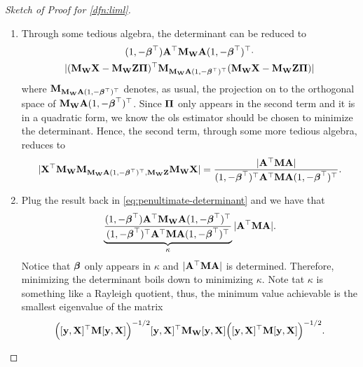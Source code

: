 \documentclass[a4paper]{article}
\begin{document}
\begin{proof}[Sketch of Proof for \autoref{dfn:liml}]
\begin{enumerate}
			Hence, to minimize the determinant, we should simply use the \gls*{ols} estimators for that column.
			We can simply consider the model with those variables partialled out:
			\begin{align*}
				|(\AA\GAMMA-\BB\XI)\T\MM_{\WW}(\AA\GAMMA-\BB\XI)|
			\end{align*}
			Another way of understanding this is to invoke the Frisch-Waugh-Lovell theorem before writing the likelihood function.
		\item
			Through some tedious algebra,
			the determinant can be reduced to
			\begin{align}\label{eq:penultimate-determinant}
				\begin{gathered}
					(1,-\bbeta\T)\AA\T\MM_{\WW}\AA(1,-\bbeta\T)\T \cdot \\
					|(\MM_\WW\XX - \MM_\WW\ZZ\PI)\T\MM_{\MM_\WW\AA(1,-\bbeta\T)\T}(\MM_\WW\XX - \MM_\WW\ZZ\PI)|
				\end{gathered}
			\end{align}
			where $\MM_{\MM_\WW\AA(1,-\bbeta\T)\T}$ denotes, as usual,
			the projection on to the orthogonal space of $\MM_\WW\AA(1,-\bbeta\T)\T$.
			Since $\PI$ only appears in the second term and it is in a quadratic form,
			we know the \gls*{ols} estimator should be chosen to minimize the determinant.
			Hence, the second term, through some more tedious algebra, reduces to
			\begin{align*}
				|\XX\T\MM_{\WW}\MM_{\MM_\WW\AA(1,-\bbeta\T)\T,\MM_{\WW}\ZZ}\MM_{\WW}\XX|
				=
				\frac{|\AA\T\MM\AA|}{(1,-\bbeta\T)\T\AA\T\MM\AA(1,-\bbeta\T)\T}.
			\end{align*}
		\item
			Plug the result back in \eqref{eq:penultimate-determinant} and we have that
			\begin{align*}
				\underbrace{
				\frac
				{ (1,-\bbeta\T)\AA\T\MM_{\WW}\AA(1,-\bbeta\T)\T }
				{ (1,-\bbeta\T)\T\AA\T\MM\AA(1,-\bbeta\T)\T }
				}_{\kappa}
				|\AA\T\MM\AA|.
			\end{align*}
			Notice that $\bbeta$ only appears in $\kappa$ and $|\AA\T\MM\AA|$ is determined.
			Therefore, minimizing the determinant boils down to minimizing $\kappa$.
			Note tat $\kappa$ is something like a Rayleigh quotient,
			thus, the minimum value achievable is the smallest eigenvalue
			of the matrix
			\begin{align*}
				\Bigl([\yy,\XX]\T\MM[\yy,\XX]\Bigr)\inv[1/2]
				[\yy,\XX]\T\MM_\WW[\yy,\XX]
				\Bigl([\yy,\XX]\T\MM[\yy,\XX]\Bigr)\inv[1/2].
			\end{align*}

\end{enumerate}
\end{proof}
\end{document}
